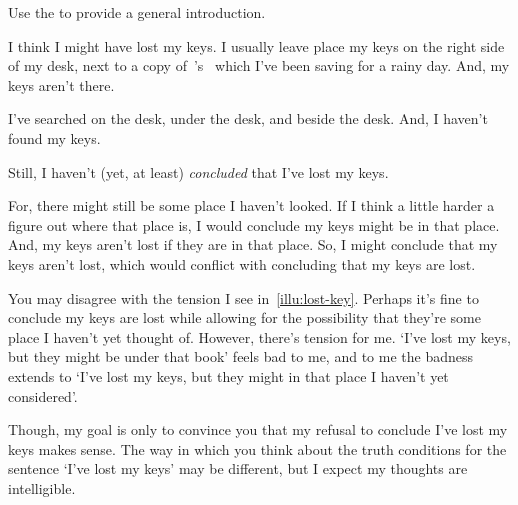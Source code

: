 \begin{note}
  Use the \illu{} to provide a general introduction.
\end{note}

\begin{note}
  \begin{scenario}
    \label{illu:lost-key}
    I think I might have lost my keys.
    I usually leave place my keys on the right side of my desk, next to a copy of~\citeauthor{Vickers:1989tr}'s~ which I've been saving for a rainy day.
    And, my keys aren't there.

    I've searched on the desk, under the desk, and beside the desk.
    And, I haven't found my keys.

    Still, I haven't (yet, at least) \emph{concluded} that I've lost my keys.

    For, there might still be some place I haven't looked.
    If I think a little harder a figure out where that place is, I would conclude my keys might be in that place.
    And, my keys aren't lost if they are in that place.
    So, I might conclude that my keys aren't lost, which would conflict with concluding that my keys are lost.
  \end{scenario}

  You may disagree with the tension I see in~\autoref{illu:lost-key}.
  Perhaps it's fine to conclude my keys are lost while allowing for the possibility that they're some place I haven't yet thought of.
  However, there's tension for me.
  `I've lost my keys, but they might be under that book' feels bad to me, and to me the badness extends to `I've lost my keys, but they might in that place I haven't yet considered'.

  Though, my goal is only to convince you that my refusal to conclude I've lost my keys makes sense.
  The way in which you think about the truth conditions for the sentence `I've lost my keys' may be different, but I expect my thoughts are intelligible.
\end{note}


